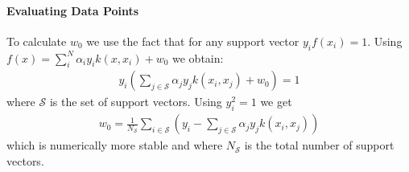 \documentclass[main]{subfiles}
\begin{document}
\paragraph{Evaluating Data Points}
To calculate $w_0$ we use the fact that for any support vector $y_if(x_i) = 1$. Using $f(x)=\sum_i^N \alpha_i y_i k(x, x_i) + w_0$ we obtain:
\begin{align}
y_i(\sum_{j \in \mathcal{S}} \alpha_j y_j k(x_i, x_j) + w_0) = 1
\end{align}
where $\mathcal{S}$ is the set of support vectors. Using $y_i^2=1$ we get
\begin{align}
w_0=\frac{1}{N_{\mathcal{S}}} \sum_{i \in \mathcal{S}} (y_i - \sum_{j \in \mathcal{S}} \alpha_j y_j k(x_i, x_j))
\end{align}
which is numerically more stable and where $N_{\mathcal{S}}$ is the total number of support vectors.
\end{document}
